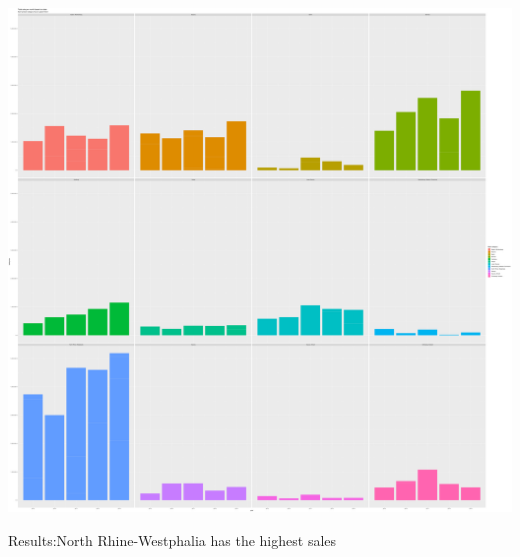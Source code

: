 \documentclass[
]{article}
\begin{document}
\includegraphics{01_tidyverse_files/figure-latex/plot-1.pdf}

Results:North Rhine-Westphalia has the highest sales
\end{document}
